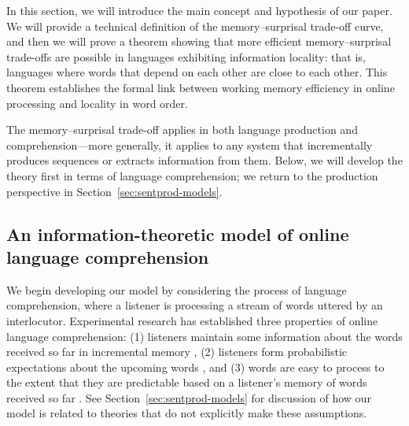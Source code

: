 In this section, we will introduce the main concept and hypothesis of our paper. %
We will provide a technical definition of the memory--surprisal trade-off curve, and then we will prove a theorem showing that more efficient memory--surprisal trade-offs are possible in languages exhibiting information locality: that is, languages where words that depend on each other are close to each other. This theorem establishes the formal link between working memory efficiency in online processing and locality in word order.

The memory--surprisal trade-off applies in both language production and comprehension---more generally, it applies to any system that incrementally produces sequences or extracts information from them. Below, we will develop the theory first in terms of language comprehension; we return to the production perspective in Section~\ref{sec:sentprod-models}.


\subsection{An information-theoretic model of online language comprehension}
\label{sec:listener-tradeoff}


We begin developing our model by considering the process of language comprehension, where a listener is processing a stream of words uttered by an interlocutor.
Experimental research has established three properties of online language comprehension: (1) listeners maintain some information about the words received so far in incremental memory \CITE, (2) listeners form probabilistic expectations about the upcoming words \citep{altmann1999incremental,kuperberg2016we, ...}, and (3) words are easy to process to the extent that they are predictable based on a listener's memory of words received so far \citep{hale2001probabilistic,levy2008expectation,futrell2020lossy}. 
See Section~\ref{sec:sentprod-models} for discussion of how our model is related to theories that do not explicitly make these assumptions.

